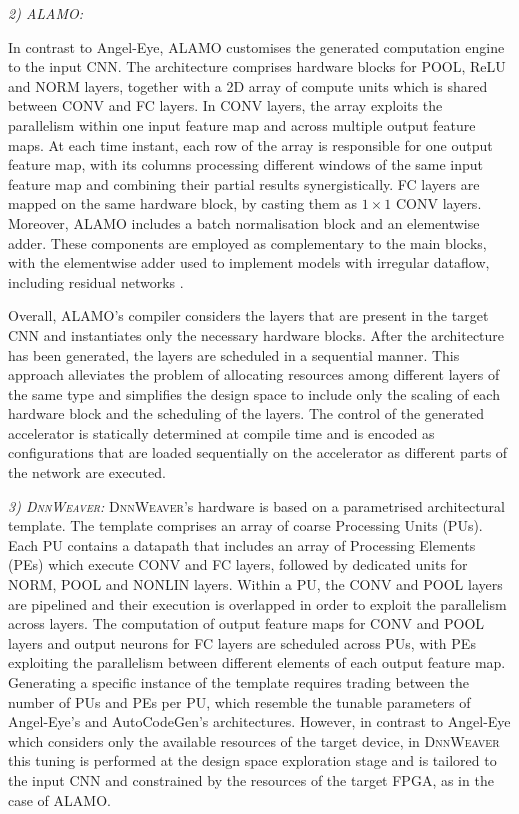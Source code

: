 \documentclass[format=acmsmall, review=false, screen=true]{acmart}
\begin{document}
\textit{2) ALAMO:}
{\color{black}In contrast to Angel-Eye, ALAMO customises the generated computation engine to the input CNN. The architecture comprises hardware blocks for POOL, ReLU and NORM layers, together with a 2D array of compute units which is shared between CONV and FC layers. In CONV layers, the array exploits the parallelism within one input feature map and across multiple output feature maps. At each time instant, each row of the array is responsible for one output feature map, with its columns processing different windows of the same input feature map and combining their partial results synergistically. FC layers are mapped on the same hardware block, by casting them as $1 \times 1$ CONV layers. Moreover, ALAMO includes a batch normalisation block and an elementwise adder. These components are employed as complementary to the main blocks, with the elementwise adder used to implement models with irregular dataflow, including residual networks \cite{He_2016}.

Overall, ALAMO's compiler considers the layers that are present in the target CNN and instantiates only the necessary hardware blocks. After the architecture has been generated, the layers are scheduled in a sequential manner. This approach alleviates the problem of allocating resources among different layers of the same type and simplifies the design space to include only the scaling of each hardware block and the scheduling of the layers. The control of the generated accelerator is statically determined at compile time and is encoded as configurations that are loaded sequentially on the accelerator as different parts of the network are executed.}



\textit{3) \textsc{DnnWeaver}:}
\textsc{DnnWeaver}'s hardware is based on a parametrised architectural template. The template comprises an array of coarse Processing Units (PUs). Each PU contains a datapath that includes an array of Processing Elements (PEs) which execute CONV and FC layers, followed by dedicated units for NORM, POOL and NONLIN layers. Within a PU, the CONV and POOL layers are pipelined and their execution is overlapped in order to exploit the parallelism across layers. The computation of output feature maps for CONV and POOL layers and output neurons for FC layers are scheduled across PUs, with PEs exploiting the parallelism between different elements of each output feature map. Generating a specific instance of the template requires trading between the number of PUs and PEs per PU, which resemble the tunable parameters of Angel-Eye's {\color{black}and AutoCodeGen's} architectures. However, in contrast to Angel-Eye which considers only the available resources of the target device, in \textsc{DnnWeaver} this tuning is performed at the design space exploration stage and is tailored to the input CNN and constrained by the resources of the target FPGA, as in the case of ALAMO.
\end{document}
